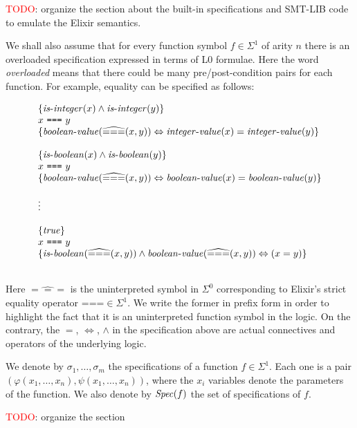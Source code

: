 \textcolor{red}{TODO}: organize the section about the built-in specifications and 
SMT-LIB code to emulate the Elixir semantics.

We shall also assume that for every function symbol $f \in \Sigma^{1}$ of 
arity $n$ there is an overloaded specification expressed in terms of L0 
formulae. Here the word \emph{overloaded} means that there could be many 
pre/post-condition pairs for each function. For example, equality can be 
specified as follows:

\[
\begin{array}{l}
\{ \mathit{is\mbox{-}integer}(x) \wedge \mathit{is\mbox{-}integer}(y) \}\\
x~\texttt{===}~y\\
\{ \mathit{boolean\mbox{-}value}(\widehat{===}(x, y)) \Leftrightarrow \mathit{integer\mbox{-}value}(x) = \mathit{integer\mbox{-}value}(y) \}\\
\\
\{ \mathit{is\mbox{-}boolean}(x) \wedge \mathit{is\mbox{-}boolean}(y) \}\\
x~\texttt{===}~y\\
\{ \mathit{boolean\mbox{-}value}(\widehat{===}(x, y)) \Leftrightarrow \mathit{boolean\mbox{-}value}(x) = \mathit{boolean\mbox{-}value}(y) \}\\
\\
\vdots
\\
\\
\{\mathit{true}\}\\
x~\texttt{===}~y\\
\{ \mathit{is\mbox{-}boolean}(\widehat{===}(x, y)) \wedge \mathit{boolean\mbox{-}value}(\widehat{===}(x, y)) \Leftrightarrow (x = y) \}\\
\\
\end{array}
\]

Here $\widehat{===}$ is the uninterpreted symbol in $\Sigma^{0}$ corresponding 
to Elixir's strict equality operator $\texttt{===} \in \Sigma^{1}$. We write 
the former in prefix form in order to highlight the fact that it is an 
uninterpreted function symbol in the logic. On the contrary, the $=$, 
$\Leftrightarrow$, $\wedge$ in the specification above are actual connectives 
and operators of the underlying logic.

We denote by $\sigma_1, \ldots, \sigma_m$ the specifications of a 
function $f \in \Sigma^{1}$. Each one is a pair 
$(\varphi(x_1, \ldots, x_n), \psi(x_1, \ldots, x_n))$, where the $x_i$ 
variables denote the parameters of the function. We also denote by $\mathit{Spec}(f)$ 
the set of specifications of $f$.

\textcolor{red}{TODO}: organize the section


